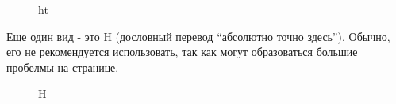 \documentclass[
  english,
  russian,
  12pt,
  a4paper,
  DIV=11,
  numbers=noendperiod]{scrreprt}
\begin{document}
\begin{figure}


\caption{\label{fig-008}ht}

\end{figure}%

Еще один вид - это H (дословный перевод \enquote{абсолютно точно
здесь}). Обычно, его не рекомендуется использовать, так как могут
образоваться большие пробелмы на странице.

\begin{figure}


\caption{\label{fig-009}H}

\end{figure}%
\end{document}
